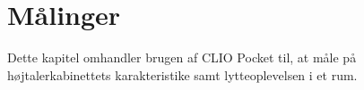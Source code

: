 \chapter{Målinger}
Dette kapitel omhandler brugen af CLIO Pocket til, at måle på højtalerkabinettets karakteristike samt lytteoplevelsen i et rum.



